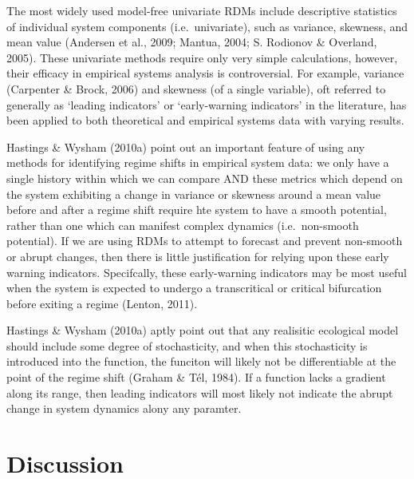 \documentclass[12pt,twoside,openany]{reedthesis}
\begin{document}
The most widely used model-free univariate RDMs include descriptive statistics of individual system components (i.e.~univariate), such as variance, skewness, and mean value (Andersen et al., 2009; Mantua, 2004; S. Rodionov \& Overland, 2005). These univariate methods require only very simple calculations, however, their efficacy in empirical systems analysis is controversial. For example, variance (Carpenter \& Brock, 2006) and skewness (of a single variable), oft referred to generally as `leading indicators' or `early-warning indicators' in the literature, has been applied to both theoretical and empirical systems data with varying results.

Hastings \& Wysham (2010a) point out an important feature of using any methods for identifying regime shifts in empirical system data: we only have a single history within which we can compare AND these metrics which depend on the system exhibiting a change in variance or skewness around a mean value before and after a regime shift require hte system to have a smooth potential, rather than one which can manifest complex dynamics (i.e.~non-smooth potential). If we are using RDMs to attempt to forecast and prevent non-smooth or abrupt changes, then there is little justification for relying upon these early warning indicators. Specifcally, these early-warning indicators may be most useful when the system is expected to undergo a transcritical or critical bifurcation before exiting a regime (Lenton, 2011).

Hastings \& Wysham (2010a) aptly point out that any realisitic ecological model should include some degree of stochasticity, and when this stochasticity is introduced into the function, the funciton will likely not be differentiable at the point of the regime shift (Graham \& Tél, 1984). If a function lacks a gradient along its range, then leading indicators will most likely not indicate the abrupt change in system dynamics alony any paramter.

\hypertarget{discussion}{%
\section{Discussion}\label{discussion}}
\end{document}
